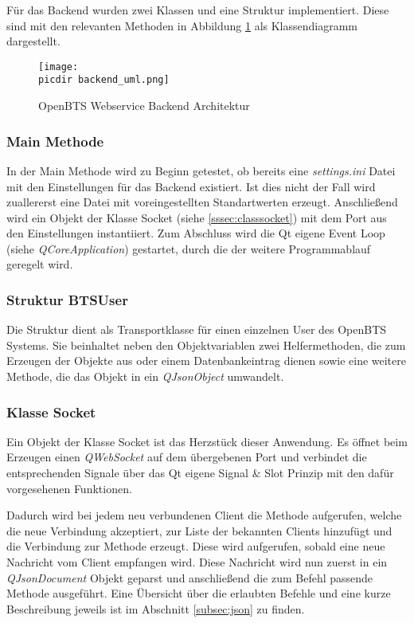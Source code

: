 Für das Backend wurden zwei Klassen und eine Struktur implementiert. Diese sind mit den relevanten Methoden in Abbildung \ref{fig:uml_class} als \UML Klassendiagramm dargestellt.
\begin{figure}[h!]
	\centering
	\texttt{[image: \\picdir backend\_uml.png]}
	\caption{OpenBTS Webservice Backend Architektur}
	\label{fig:uml_class}
\end{figure}

\subsubsection*{Main Methode}

In der Main Methode wird zu Beginn getestet, ob bereits eine \textit{settings.ini} Datei mit den Einstellungen für das Backend existiert. Ist dies nicht der Fall wird zuallererst eine Datei mit voreingestellten Standartwerten erzeugt. Anschließend wird ein Objekt der Klasse Socket (siehe \ref{sssec:classsocket}) mit dem Port aus den Einstellungen instantiiert. Zum Abschluss wird die Qt eigene Event Loop (siehe \textit{QCoreApplication}) gestartet, durch die der weitere Programmablauf geregelt wird.

\subsubsection*{Struktur BTSUser}
Die Struktur dient als Transportklasse für einen einzelnen User des OpenBTS Systems. Sie beinhaltet neben den Objektvariablen zwei Helfermethoden, die zum Erzeugen der Objekte aus \JSON oder einem Datenbankeintrag dienen sowie eine weitere Methode, die das Objekt in ein \textit{QJsonObject} umwandelt.


\subsubsection*{Klasse Socket}
\label{sssec:classsocket}
Ein Objekt der Klasse Socket ist das Herzstück dieser Anwendung. Es öffnet beim Erzeugen einen \textit{QWebSocket} auf dem übergebenen Port und verbindet die entsprechenden Signale über das Qt eigene Signal \& Slot Prinzip mit den dafür vorgesehenen Funktionen.

Dadurch wird bei jedem neu verbundenen Client die Methode  aufgerufen, welche die neue Verbindung akzeptiert, zur Liste der bekannten Clients hinzufügt und die Verbindung zur  Methode erzeugt. Diese wird aufgerufen, sobald eine neue Nachricht vom Client empfangen wird. Diese Nachricht wird nun zuerst in ein \textit{QJsonDocument} Objekt geparst und anschließend die zum Befehl passende Methode ausgeführt. Eine Übersicht über die erlaubten Befehle und eine kurze Beschreibung jeweils ist im Abschnitt \ref{subsec:json} zu finden.



